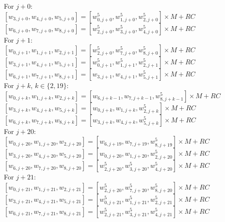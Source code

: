 \begin{center}
    For $j + 0$: \\
    $ [w_{3, j + 0}, w_{4, j + 0}, w_{5, j + 0}] = [w_{0, j + 0}^5, w_{1, j + 0}^5, w_{2, j + 0}^5] \times M + RC$ \\
    $ [w_{6, j + 0}, w_{7, j + 0}, w_{8, j + 0}] = [w_{2, j + 0}^5, w_{3, j + 0}^5, w_{4, j + 0}^5] \times M + RC$ \\
    For $j + 1$: \\
    $ [w_{0, j + 1}, w_{1, j + 1}, w_{2, j + 1}] = [w_{2, j + 0}^5, w_{7, j + 0}^5, w_{8, j + 0}^5] \times M + RC$ \\
    $ [w_{3, j + 1}, w_{4, j + 1}, w_{5, j + 1}] = [w_{0, j + 1}^5, w_{1, j + 1}^5, w_{2, j + 1}^5] \times M + RC$ \\
    $ [w_{6, j + 1}, w_{7, j + 1}, w_{8, j + 1}] = [w_{3, j + 1}, w_{4, j + 1}, w_{5, j + 1}^5] \times M + RC$ \\
    For $j + k$, $k \in \{2, 19\}$: \\
    $ [w_{0, j + k}, w_{1, j + k}, w_{2, j + k}] = [w_{6, j + k - 1}, w_{7, j + k - 1}, w_{8, j + k - 1}^5] \times M + RC$ \\
    $ [w_{3, j + k}, w_{4, j + k}, w_{5, j + k}] = [w_{0, j + k}, w_{1, j + k}, w_{2, j + k}^5] \times M + RC$ \\
    $ [w_{6, j + k}, w_{7, j + k}, w_{8, j + k}] = [w_{3, j + k}, w_{4, j + k}, w_{5, j + k}^5] \times M + RC$ \\
    For $j + 20$: \\
    $ [w_{0, j + 20}, w_{1, j + 20}, w_{2, j + 20}] = [w_{6, j + 19}, w_{7, j + 19}, w_{8, j + 19}^5] \times M + RC$ \\
    $ [w_{3, j + 20}, w_{4, j + 20}, w_{5, j + 20}] = [w_{0, j + 20}, w_{1, j + 20}, w_{2, j + 20}^5] \times M + RC$ \\
    $ [w_{6, j + 20}, w_{7, j + 20}, w_{8, j + 20}] = [w_{2, j + 20}^5, w_{3, j + 20}^5, w_{4, j + 20}^5] \times M + RC$ \\
    For $j + 21$: \\
    $ [w_{0, j + 21}, w_{1, j + 21}, w_{2, j + 21}] = [w_{2, j + 20}^5, w_{7, j + 20}^5, w_{8, j + 20}^5] \times M + RC$ \\
    $ [w_{3, j + 21}, w_{4, j + 21}, w_{5, j + 21}] = [w_{0, j + 21}^5, w_{1, j + 21}^5, w_{2, j + 21}^5] \times M + RC$ \\
    $ [w_{6, j + 21}, w_{7, j + 21}, w_{8, j + 21}] = [w_{2, j + 21}^5, w_{3, j + 21}^5, w_{4, j + 21}^5] \times M + RC$ \\
    
\end{center}
